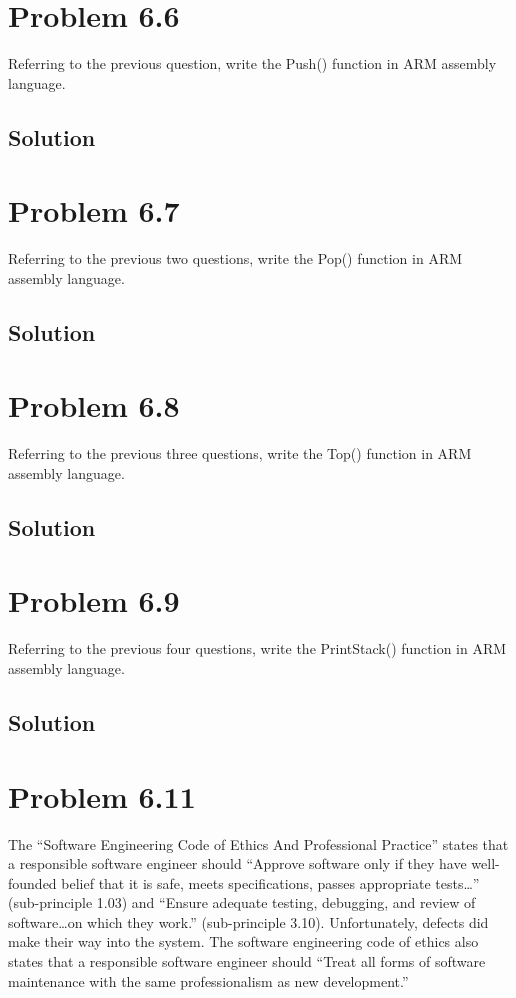 \documentclass[letterpaper,11pt]{texMemo} %
\begin{document}
\section*{Problem 6.6}
Referring to the previous question, write the Push() function in ARM assembly language.
\subsection*{Solution}


\section*{Problem 6.7}
Referring to the previous two questions, write the Pop() function in ARM assembly language.
\subsection*{Solution}


\section*{Problem 6.8}
Referring to the previous three questions, write the Top() function in ARM assembly language.
\subsection*{Solution}


\section*{Problem 6.9}
Referring to the previous four questions, write the PrintStack() function in ARM assembly language.
\subsection*{Solution}


\section*{Problem 6.11}
The “Software Engineering Code of Ethics And Professional Practice” states that a responsible software
engineer should “Approve software only if they have well-founded belief that it is safe, meets
specifications, passes appropriate tests…” (sub-principle 1.03) and “Ensure adequate testing, debugging,
and review of software…on which they work.” (sub-principle 3.10). Unfortunately, defects did make their
way into the system.
The software engineering code of ethics also states that a responsible software engineer should “Treat
all forms of software maintenance with the same professionalism as new development.”
\end{document}
